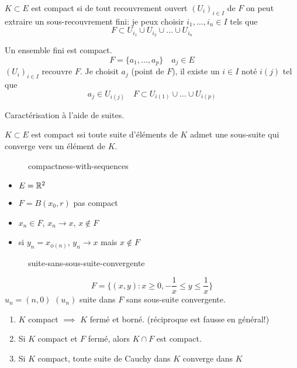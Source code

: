\begin{definition}
    $K \subset E$ est compact si de tout recouvrement ouvert $(U_i)_{i \in I}$ de $F$ on peut extraire un sous-recouvrement fini: je peux choisir  $i_1, \ldots, i_n \in I$ tels que 
    \[
    F \subset U_{i_1} \cup U_{i_2} \cup \ldots \cup U_{i_n}
    \] 
\end{definition}
\begin{property}
   Un ensemble fini est compact. 
   \[
       F = \{a_1, \ldots, a_p\} \quad a_j \in E
   \] 
   $(U_i)_{i \in I}$ recouvre $F$.
   Je choisit  $a_j$ (point de $F$), il existe un $i \in I$ noté  $i(j)$ tel que 
    \[
   a_j \in U_{i(j)} \quad F \subset U_{i(1)} \cup \ldots \cup U_{i(p)}
   \] 
\end{property}
\begin{theorem}
    Caractérisation à l'aide de suites. \par
    $K \subset E$ est compact ssi toute suite d'éléments de $K$ admet une sous-suite qui converge vers un élément de  $K$.
\end{theorem}
\begin{eg}
    \begin{figure}[H]
        \centering
        \caption{compactness-with-sequences}
        \label{fig:compactness-with-sequences}
    \end{figure}
    \begin{itemize}
        \item $E = \mathbb{R}^2$
        \item $F = B(x_0, r)$ pas compact
        \item $x_n \in F$,  $x_n \to x$, $x \not\in F$
        \item si $y_n = x_{\phi(n)}$, $y_n \to x$ mais $x \not\in F$
    \end{itemize}
\end{eg}
\begin{eg}
    
\begin{figure}[H]
    \centering
    \caption{suite-sans-sous-suite-convergente}
    \label{fig:suite-sans-sous-suite-convergente}
\end{figure}
\[
    F = \{(x, y): x \ge 0, -\frac{1}{x} \le y \le \frac{1}{x} \}
\] 
$u_n = (n, 0)$  $(u_n)$ suite dans  $F$ sans sous-suite convergente.
\end{eg}

\begin{prop}
    \begin{enumerate}
        \item $K$ compact $\implies$ $K$ fermé et borné. (réciproque est fausse en général!)
        \item Si $K$ compact et $F$ fermé, alors  $K \cap F$ est compact.
        \item Si $K$ compact, toute suite de Cauchy dans  $K$ converge dans  $K$
    \end{enumerate}
\end{prop}

